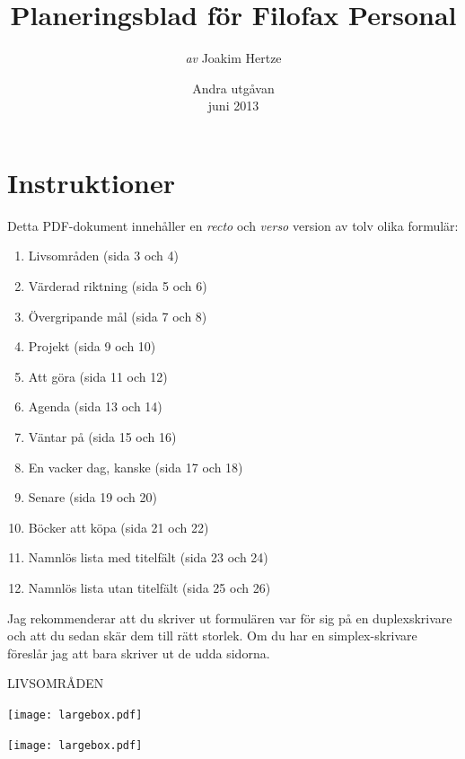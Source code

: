 \documentclass[11pt,titlepage]{article}
\begin{document}
	
\title{Planeringsblad för Filofax Personal}
\author{\emph{av} Joakim Hertze}
\date{Andra utgåvan \\ juni 2013}

\maketitle

\pagebreak

\section{Instruktioner}

Detta PDF-dokument innehåller en \emph{recto} och \emph{verso} version av tolv olika formulär:


\begin{enumerate}
	\item Livsområden (sida 3 och 4)
	\item Värderad riktning (sida 5 och 6)
	\item Övergripande mål (sida 7 och 8)
	\item Projekt (sida 9 och 10)
	\item Att göra (sida 11 och 12)
	\item Agenda (sida 13 och 14)
	\item Väntar på (sida 15 och 16)
	\item En vacker dag, kanske (sida 17 och 18)
	\item Senare (sida 19 och 20)
	\item Böcker att köpa (sida 21 och 22)
	\item Namnlös lista med titelfält (sida 23 och 24)
	\item Namnlös lista utan titelfält (sida 25 och 26)
\end{enumerate}

Jag rekommenderar att du skriver ut formulären var för sig på en duplexskrivare och att du sedan skär dem till rätt storlek. Om du har en simplex-skrivare föreslår jag att bara skriver ut de udda sidorna.

\pagebreak

\small %
\hfill LIVSOMRÅDEN

\vspace{6mm}

\noindent
\texttt{[image: largebox.pdf]}

\vspace{7,5mm}

\noindent
\texttt{[image: largebox.pdf]}
\end{document}
